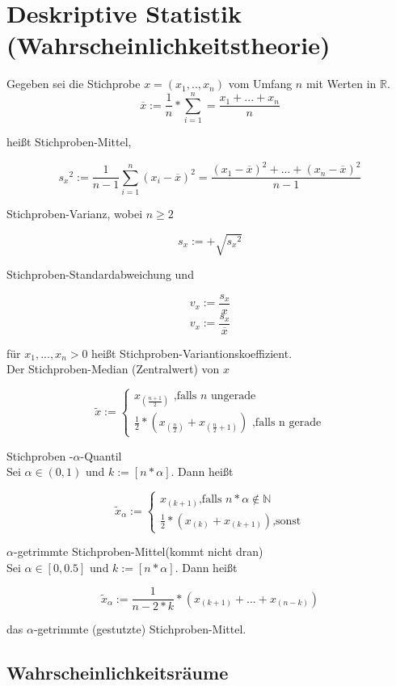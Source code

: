 \section{Deskriptive Statistik (Wahrscheinlichkeitstheorie)}

Gegeben sei die Stichprobe $x=(x_1,..,x_n)$ vom Umfang $n$ mit Werten in $\mathbb{R}$.
\[\overline{x}:= \frac{1}{n}*\sum_{i = 1}^{n}=\frac{x_1+...+x_n}{n}     \]

heißt Stichproben-Mittel,

\[{s_x}^2:=\frac{1}{n-1}\sum_{i=1}^{n}(x_i-\overline{x})^2   =\frac{(x_1-\overline{x})^2+...+(x_n-\overline{x})^2}{n-1}\]

Stichproben-Varianz, wobei $n\geq 2$

\[s_x := +\sqrt{{s_x}^2} \]

Stichproben-Standardabweichung und

\[v_x := \frac{s_x}{x} \]
\[v_x := \frac{s_x}{\overline{x}} \]


für $x_1,...,x_n >0 $ heißt Stichproben-Variantionskoeffizient.\\

Der Stichproben-Median (Zentralwert) von $x$

\[\tilde{x} :=\begin{cases}x_{(\frac{n+1}{2})}\textrm{    ,falls $n$ ungerade}\\
    \frac{1}{2}*(x_{(\frac{n}{2})}+x_{(\frac{n}{2}+1)})\textrm{ ,falls n gerade}\end{cases}\]

Stichproben -$\alpha$-Quantil\\

Sei $\alpha \in (0,1)$ und $k:=[n*\alpha]$. Dann heißt

\[\tilde{x}_\alpha  :=\begin{cases}x_{(k+1)}\textrm{,falls $n*\alpha \notin \mathbb{N} $}\\
    \frac{1}{2}*(x_{(k)}+x_{(k+1)})\textrm{,sonst}\end{cases}\]


$\alpha$-getrimmte Stichproben-Mittel(kommt nicht dran)\\

Sei $\alpha \in [0,0.5]$ und $k:=[n*\alpha ]$. Dann heißt

\[\tilde{x}_\alpha := \frac{1}{n-2*k}*(x_{(k+1)}+...+x_{(n-k)}) \]

das $\alpha $-getrimmte (gestutzte) Stichproben-Mittel.


\subsection{Wahrscheinlichkeitsräume}

